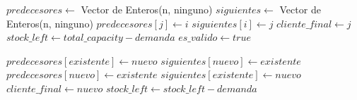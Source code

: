\begin{algorithm}[H]
	\caption{\Comment $\mathcal{O}(n)$}
	\label{nuevo-truck}
	\begin{algorithmic}[1]
		\State $predecesores \gets$ Vector de Enteros(n, ninguno)
		\State $siguientes \gets$ Vector de Enteros(n, ninguno)
		\State $predecesores[j] \gets i$
		\State $siguientes[i] \gets j$
		\State $cliente\_final \gets j$	
		\State $stock\_left \gets total\_capacity - demanda$ 
		\State $es\_valido \gets  true$ 
		\EndFunction
	\end{algorithmic}
\end{algorithm}

\begin{algorithm}[H]
	\caption{\Comment $\mathcal{O}(1)$}
	\label{visitar-nodo}
	\begin{algorithmic}[1]
		\State $predecesores[existente] \gets nuevo$
		\State $siguientes[nuevo] \gets existente$
		\Else 
		\State $predecesores[nuevo] \gets existente$
		\State $siguientes[existente] \gets nuevo$
		\State $cliente\_final \gets nuevo$
		\EndIf
		\State $stock\_left \gets stock\_left-demanda$
		\EndFunction
	\end{algorithmic}
\end{algorithm}
